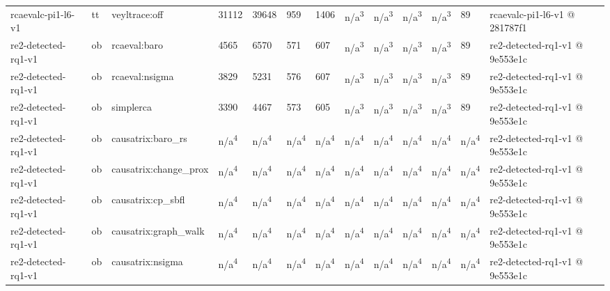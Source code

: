 \begin{table}[t]
\begin{tabular}{lllllllllllll}
rcaevalc-pi1-l6-v1 & tt & veyltrace:off & 31112 & 39648 & 959 & 1406 & n/a\textsuperscript{3} & n/a\textsuperscript{3} & n/a\textsuperscript{3} & n/a\textsuperscript{3} & 89 & rcaevalc-pi1-l6-v1 @ 281787f1 \\
re2-detected-rq1-v1 & ob & rcaeval:baro & 4565 & 6570 & 571 & 607 & n/a\textsuperscript{3} & n/a\textsuperscript{3} & n/a\textsuperscript{3} & n/a\textsuperscript{3} & 89 & re2-detected-rq1-v1 @ 9e553e1c \\
re2-detected-rq1-v1 & ob & rcaeval:nsigma & 3829 & 5231 & 576 & 607 & n/a\textsuperscript{3} & n/a\textsuperscript{3} & n/a\textsuperscript{3} & n/a\textsuperscript{3} & 89 & re2-detected-rq1-v1 @ 9e553e1c \\
re2-detected-rq1-v1 & ob & simplerca & 3390 & 4467 & 573 & 605 & n/a\textsuperscript{3} & n/a\textsuperscript{3} & n/a\textsuperscript{3} & n/a\textsuperscript{3} & 89 & re2-detected-rq1-v1 @ 9e553e1c \\
re2-detected-rq1-v1 & ob & causatrix:baro\_rs & n/a\textsuperscript{4} & n/a\textsuperscript{4} & n/a\textsuperscript{4} & n/a\textsuperscript{4} & n/a\textsuperscript{4} & n/a\textsuperscript{4} & n/a\textsuperscript{4} & n/a\textsuperscript{4} & n/a\textsuperscript{4} & re2-detected-rq1-v1 @ 9e553e1c \\
re2-detected-rq1-v1 & ob & causatrix:change\_prox & n/a\textsuperscript{4} & n/a\textsuperscript{4} & n/a\textsuperscript{4} & n/a\textsuperscript{4} & n/a\textsuperscript{4} & n/a\textsuperscript{4} & n/a\textsuperscript{4} & n/a\textsuperscript{4} & n/a\textsuperscript{4} & re2-detected-rq1-v1 @ 9e553e1c \\
re2-detected-rq1-v1 & ob & causatrix:cp\_sbfl & n/a\textsuperscript{4} & n/a\textsuperscript{4} & n/a\textsuperscript{4} & n/a\textsuperscript{4} & n/a\textsuperscript{4} & n/a\textsuperscript{4} & n/a\textsuperscript{4} & n/a\textsuperscript{4} & n/a\textsuperscript{4} & re2-detected-rq1-v1 @ 9e553e1c \\
re2-detected-rq1-v1 & ob & causatrix:graph\_walk & n/a\textsuperscript{4} & n/a\textsuperscript{4} & n/a\textsuperscript{4} & n/a\textsuperscript{4} & n/a\textsuperscript{4} & n/a\textsuperscript{4} & n/a\textsuperscript{4} & n/a\textsuperscript{4} & n/a\textsuperscript{4} & re2-detected-rq1-v1 @ 9e553e1c \\
re2-detected-rq1-v1 & ob & causatrix:nsigma & n/a\textsuperscript{4} & n/a\textsuperscript{4} & n/a\textsuperscript{4} & n/a\textsuperscript{4} & n/a\textsuperscript{4} & n/a\textsuperscript{4} & n/a\textsuperscript{4} & n/a\textsuperscript{4} & n/a\textsuperscript{4} & re2-detected-rq1-v1 @ 9e553e1c \\

\end{tabular}
\end{table}
